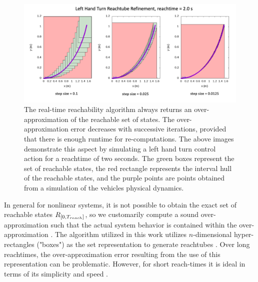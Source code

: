 \documentclass[manuscript,screen,review]{acmart}
\newcommand{\diego}[1]{\textcolor{purple}{\textbf{\underline{DM:}} #1}}
\begin{document}
\begin{figure}[htbp]%
  \centering
  \includegraphics[width=\linewidth]{figures/refinement_cropped.pdf}
  \caption{The real-time reachability algorithm always returns an over-approximation of the reachable set of states. The over-approximation error decreases with successive iterations, provided that there is enough runtime for re-computations. The above images demonstrate this aspect by simulating a left hand turn control action for a reachtime of two seconds. The green boxes represent the set of reachable states, the red rectangle represents the interval hull of the reachable states, and the purple points are points obtained from a simulation of the vehicles physical dynamics.}
  \label{fig:reach_refine}
\end{figure}%
In general for nonlinear systems, it is not possible to obtain the exact set of reachable states $\mathnormal{R}_{[0,T_{reach}]}$, so we customarily compute a sound over-approximation such that the actual system behavior is contained within the over-approximation \cite{AlthoffNonlinear,Lin2020,Asarin2003}. The algorithm utilized in this work utilizes $n$-dimensional hyper-rectangles ("boxes") as the set representation to generate reachtubes \cite{Johnson2016}. Over long reachtimes, the over-approximation error resulting from the use of this representation can be problematic. However, for short reach-times it is ideal in terms of its simplicity and speed \cite{Bak2014}. 
\end{document}
